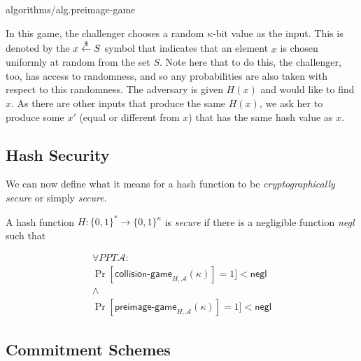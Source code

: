 {algorithms/alg.preimage-game}

In this game, the challenger chooses a random $\kappa$-bit value as the input. This is denoted by
the $x \overset{\$}{\gets} S$ symbol that indicates that an element $x$ is chosen uniformly at random
from the set $S$. Note here that to do this, the challenger, too, has access to randomness,
and so any probabilities are also taken with respect to this randomness.
The adversary is given $H(x)$ and would like to find $x$.
As there are other inputs that produce the same $H(x)$,
we ask her to produce some $x'$ (equal or different from $x$) that has the same hash value
as $x$.

\subsection*{Hash Security}

We can now define what it means for a hash function to be \emph{cryptographically secure}
or simply \emph{secure}.

\begin{definition}
  A hash function $H: \{0, 1\}^* \longrightarrow \{0, 1\}^\kappa$ is \emph{secure}
  if there is a negligible function \emph{negl} such that

  \begin{gather*}
    \forall PPT \mathcal{A}:\\
      \Pr[\textsf{collision-game}_{H,\mathcal{A}}(\kappa)] = 1] < \textsf{negl}
      \\\land\\
      \Pr[\textsf{preimage-game}_{H,\mathcal{A}}(\kappa)] = 1] < \textsf{negl}
  \end{gather*}
\end{definition}

\subsection*{Commitment Schemes}

